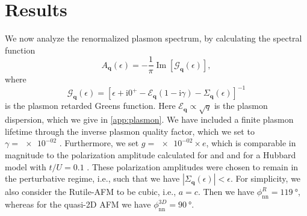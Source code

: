 \documentclass[aps,prb,reprint,twocolumns,superscriptaddress,nofootinbib]{revtex4-2}
\makeatletter
\newcommand{\ii}{\mathrm{i}}
\renewcommand{\Im}{\operatorname{Im}}
\newcommand{\gammaplasmon}{\num{e-02}}
\newcommand{\gpolarizationrutile}{\num{e-02}} %
\providecommand{\DIFaddtex}[1]{{\protect\color{blue}\uwave{#1}}} %
\providecommand{\DIFdeltex}[1]{{\protect\color{red}\sout{#1}}} %
\providecommand{\DIFaddbegin}{} %
\providecommand{\DIFaddend}{} %
\providecommand{\DIFdelbegin}{} %
\providecommand{\DIFdelend}{} %
\providecommand{\DIFadd}[1]{\texorpdfstring{\DIFaddtex{#1}}{#1}} %
\providecommand{\DIFdel}[1]{\texorpdfstring{\DIFdeltex{#1}}{}} %
\newcommand{\DIFscaledelfig}{0.5}
\newlength{\DIFdelgraphicswidth} %
\newlength{\DIFdelgraphicsheight} %
\newcommand{\DIFaddincludegraphics}[2][]{{\color{blue}\fbox{\DIFOincludegraphics[#1]{#2}}}} %
\newcommand{\DIFdelincludegraphics}[2][]{%
\sbox{\DIFdelgraphicsbox}{\DIFOincludegraphics[#1]{#2}}%
\settoboxwidth{\DIFdelgraphicswidth}{\DIFdelgraphicsbox} %
\settoboxtotalheight{\DIFdelgraphicsheight}{\DIFdelgraphicsbox} %
\scalebox{\DIFscaledelfig}{%
\parbox[b]{\DIFdelgraphicswidth}{\usebox{\DIFdelgraphicsbox}\\[-\baselineskip] \rule{\DIFdelgraphicswidth}{0em}}\llap{\resizebox{\DIFdelgraphicswidth}{\DIFdelgraphicsheight}{%
\setlength{\unitlength}{\DIFdelgraphicswidth}%
\begin{picture}(1,1)%
\thicklines\linethickness{2pt} %
{\color[rgb]{1,0,0}\put(0,0){\framebox(1,1){}}}%
{\color[rgb]{1,0,0}\put(0,0){\line( 1,1){1}}}%
{\color[rgb]{1,0,0}\put(0,1){\line(1,-1){1}}}%
\end{picture}%
}\hspace*{3pt}}} %
} %
\DeclareRobustCommand{\DIFaddbegin}{\DIFOaddbegin \let\includegraphics\DIFaddincludegraphics} %
\DeclareRobustCommand{\DIFaddend}{\DIFOaddend \let\includegraphics\DIFOincludegraphics} %
\DeclareRobustCommand{\DIFdelbegin}{\DIFOdelbegin \let\includegraphics\DIFdelincludegraphics} %
\DeclareRobustCommand{\DIFdelend}{\DIFOaddend \let\includegraphics\DIFOincludegraphics} %
\let\sout@orig\sout %
\renewcommand{\sout}[1]{\ifmmode\text{\sout@orig{\ensuremath{#1}}}\else\sout@orig{#1}\fi} %
\makeatother
\begin{document}
	
	\section{Results}
	\label{sec:results}
	We now analyze the renormalized plasmon spectrum, by calculating the spectral function \cite{stoofUltracoldQuantumFields2009}
	\begin{equation}
		A_{\bm q}(\epsilon) = -\frac{1}{\pi}\Im[\mathcal G_{\bm q}(\epsilon)],
	\end{equation}
	where 
	\begin{equation}
		\mathcal G_{\bm q}(\epsilon) = \left[\epsilon + \ii 0^+ - \mathcal{E}_{\bm q}(1-\ii\gamma) - \Sigma_{\bm q}(\epsilon) \right]^{-1}
	\end{equation}
	is the plasmon retarded Greens function. Here $\mathcal E_{\bm q}\propto\sqrt{q}$ is the plasmon dispersion, which we give in \cref{app:plasmon}. We have included a finite plasmon lifetime through the inverse plasmon quality factor, which we set to $\gamma=\gammaplasmon$ \cite{principiIntrinsicLifetimeDirac2013}. 
	Furthermore, we set $g=\gpolarizationrutile\times e$, which is comparable in magnitude to the polarization amplitude calculated for  \cite{seifertOpticalExcitationMagnons2019} and  \cite{mostovoyTemperatureDependentMagnetoelectricEffect2010} and for a Hubbard model with $t/U=0.1$ \cite{zhuSpinorbitCouplingElectronic2014}. These polarization amplitudes were chosen to remain in the perturbative regime, i.e., such that we have $|\Sigma_{\bm q}(\epsilon)|<\epsilon$. For simplicity, we also consider the Rutile-AFM to  be cubic, i.e., $a=c$. Then we have $\phi_{\mathrm{nn}}^{R}=\SI{119}{\degree}$, whereas for the quasi-2D AFM we have \DIFdelbegin \DIFdel{$\phi_{\mathrm{nn}}^{3D}=\SI{90}{\degree}$}\DIFdelend \DIFaddbegin \DIFadd{$\phi_{\mathrm{nn}}^{2D}=\SI{90}{\degree}$}\DIFaddend .
\end{document}
